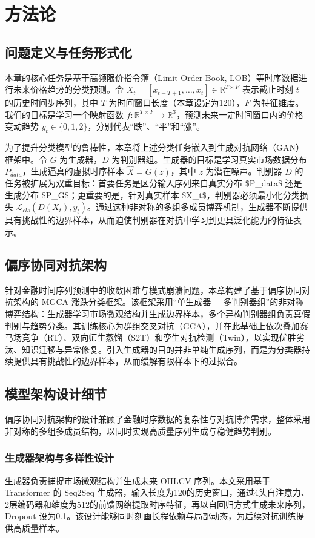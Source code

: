 \section{方法论}

\subsection{问题定义与任务形式化}
本章的核心任务是基于高频限价指令簿（Limit Order Book, LOB）等时序数据进行未来价格趋势的分类预测。令 $X_t = [x_{t-T+1}, \dots, x_t] \in \mathbb{R}^{T \times F}$ 表示截止时刻 $t$ 的历史时间步序列，其中 $T$ 为时间窗口长度（本章设定为120），$F$ 为特征维度。我们的目标是学习一个映射函数 $f: \mathbb{R}^{T \times F} \rightarrow \mathbb{R}^3$，预测未来一定时间窗口内的价格变动趋势 $y_t \in \{0, 1, 2\}$，分别代表“跌”、“平”和“涨”。

为了提升分类模型的鲁棒性，本章将上述分类任务嵌入到生成对抗网络（GAN）框架中。令 $G$ 为生成器，$D$ 为判别器组。生成器的目标是学习真实市场数据分布 $P_{data}$，生成逼真的虚拟时序样本 $\hat{X} = G(z)$，其中 $z$ 为潜在噪声。判别器 $D$ 的任务被扩展为双重目标：首要任务是区分输入序列来自真实分布 \$P_{data}\$ 还是生成分布 \$P_G\$；更重要的是，针对真实样本 \$X_t\$，判别器必须最小化分类损失 $\mathcal{L}_{cls}(D(X_t), y_t)$。通过这种非对称的多组多成员博弈机制，生成器不断提供具有挑战性的边界样本，从而迫使判别器在对抗中学习到更具泛化能力的特征表示。

\subsection{偏序协同对抗架构}
针对金融时间序列预测中的收敛困难与模式崩溃问题，本章构建了基于偏序协同对抗架构的 MGCA 涨跌分类框架。该框架采用“单生成器 + 多判别器组”的非对称博弈结构：生成器学习市场微观结构并生成边界样本，多个异构判别器组负责真假判别与趋势分类。其训练核心为群组交叉对抗（GCA），并在此基础上依次叠加赛马场竞争（RT）、双向师生蒸馏（S2T）和孪生对抗检测（Twin），以实现优胜劣汰、知识迁移与异常修复。引入生成器的目的并非单纯生成序列，而是为分类器持续提供具有挑战性的边界样本，从而缓解有限样本下的过拟合。

\subsection{模型架构设计细节}
偏序协同对抗架构的设计兼顾了金融时序数据的复杂性与对抗博弈需求，整体采用非对称的多组多成员结构，以同时实现高质量序列生成与稳健趋势判别。

\subsubsection{生成器架构与多样性设计}
生成器负责捕捉市场微观结构并生成未来 OHLCV 序列。本文采用基于 Transformer 的 Seq2Seq 生成器，输入长度为120的历史窗口，通过4头自注意力、2层编码器和维度为512的前馈网络提取时序特征，再以自回归方式生成未来序列，Dropout 设为0.1。该设计能够同时刻画长程依赖与局部动态，为后续对抗训练提供高质量样本。

